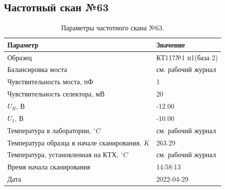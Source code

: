 \subsection{Частотный скан №63}
\begin{table}[!ht]
    \centering
    \caption{Параметры частотного скана №63.}
    \begin{tabular}{|l|l|}
        \hline
        Параметр                                       & Значение                  \\ \hline
        Образец                                        & КТ117№1 п1(база 2)        \\ \hline
        Балансировка моста                             & см. рабочий журнал        \\ \hline
        Чувствительность моста, пФ                     & 1                         \\ \hline
        Чувствительность селектора, мВ                 & 20                        \\ \hline
        $U_R$, В                                       & -12.00                    \\ \hline
        $U_1$, В                                       & -10.00                    \\ \hline
        Температура в лаборатории, $^\circ C$          & см. рабочий журнал        \\ \hline
        Температура образца в начале сканирования, $K$ & 263.29                    \\ \hline
        Температура, установленная на КТХ, $^\circ C$  & см. рабочий журнал        \\ \hline
        Время начала сканирования                      & 14:58:13                  \\ \hline
        Дата                                           & 2022-04-29                \\ \hline
    \end{tabular}
    \label{table:frequency_scan_63}
\end{table}


